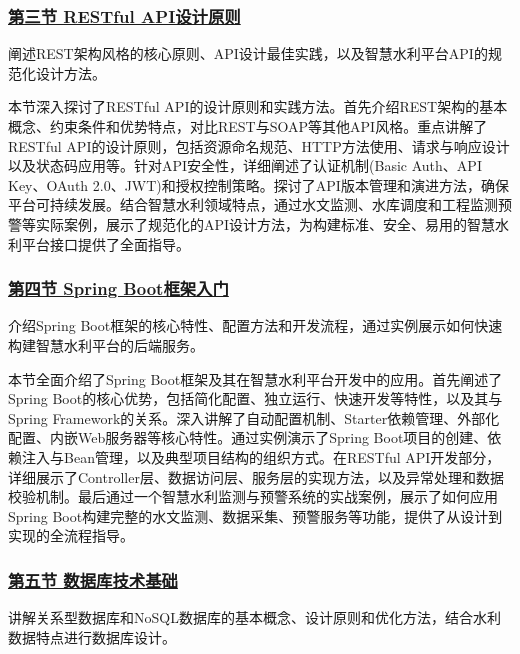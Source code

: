 \subsubsection{\texorpdfstring{\href{section05-03.md}{第三节 RESTful
API设计原则}}{第三节 RESTful API设计原则}}\label{ux7b2cux4e09ux8282-restful-apiux8bbeux8ba1ux539fux5219}

阐述REST架构风格的核心原则、API设计最佳实践，以及智慧水利平台API的规范化设计方法。

本节深入探讨了RESTful
API的设计原则和实践方法。首先介绍REST架构的基本概念、约束条件和优势特点，对比REST与SOAP等其他API风格。重点讲解了RESTful
API的设计原则，包括资源命名规范、HTTP方法使用、请求与响应设计以及状态码应用等。针对API安全性，详细阐述了认证机制(Basic
Auth、API Key、OAuth
2.0、JWT)和授权控制策略。探讨了API版本管理和演进方法，确保平台可持续发展。结合智慧水利领域特点，通过水文监测、水库调度和工程监测预警等实际案例，展示了规范化的API设计方法，为构建标准、安全、易用的智慧水利平台接口提供了全面指导。

\subsubsection{\texorpdfstring{\href{section05-04.md}{第四节 Spring
Boot框架入门}}{第四节 Spring Boot框架入门}}\label{ux7b2cux56dbux8282-spring-bootux6846ux67b6ux5165ux95e8}

介绍Spring
Boot框架的核心特性、配置方法和开发流程，通过实例展示如何快速构建智慧水利平台的后端服务。

本节全面介绍了Spring
Boot框架及其在智慧水利平台开发中的应用。首先阐述了Spring
Boot的核心优势，包括简化配置、独立运行、快速开发等特性，以及其与Spring
Framework的关系。深入讲解了自动配置机制、Starter依赖管理、外部化配置、内嵌Web服务器等核心特性。通过实例演示了Spring
Boot项目的创建、依赖注入与Bean管理，以及典型项目结构的组织方式。在RESTful
API开发部分，详细展示了Controller层、数据访问层、服务层的实现方法，以及异常处理和数据校验机制。最后通过一个智慧水利监测与预警系统的实战案例，展示了如何应用Spring
Boot构建完整的水文监测、数据采集、预警服务等功能，提供了从设计到实现的全流程指导。

\subsubsection{\texorpdfstring{\href{section05-05.md}{第五节
数据库技术基础}}{第五节 数据库技术基础}}\label{ux7b2cux4e94ux8282-ux6570ux636eux5e93ux6280ux672fux57faux7840}

讲解关系型数据库和NoSQL数据库的基本概念、设计原则和优化方法，结合水利数据特点进行数据库设计。


